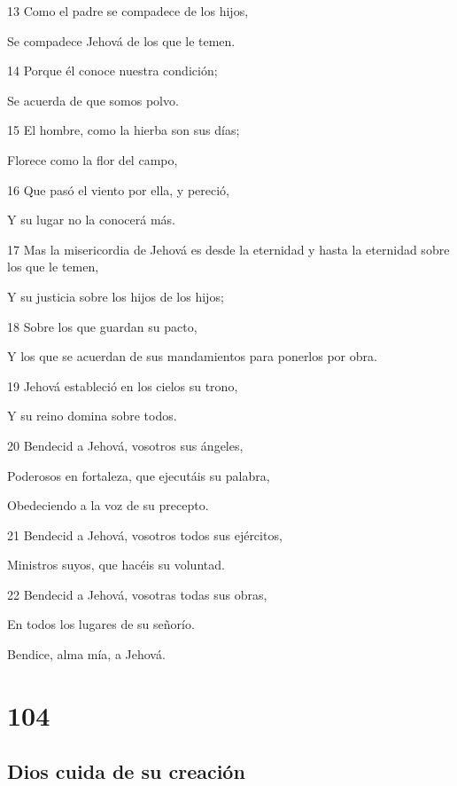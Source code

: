 \par 13 Como el padre se compadece de los hijos,
\par Se compadece Jehová de los que le temen.
\par 14 Porque él conoce nuestra condición;
\par Se acuerda de que somos polvo.
\par 15 El hombre, como la hierba son sus días;
\par Florece como la flor del campo,
\par 16 Que pasó el viento por ella, y pereció,
\par Y su lugar no la conocerá más.
\par 17 Mas la misericordia de Jehová es desde la eternidad y hasta la eternidad sobre los que le temen,
\par Y su justicia sobre los hijos de los hijos;
\par 18 Sobre los que guardan su pacto,
\par Y los que se acuerdan de sus mandamientos para ponerlos por obra.
\par 19 Jehová estableció en los cielos su trono,
\par Y su reino domina sobre todos.
\par 20 Bendecid a Jehová, vosotros sus ángeles,
\par Poderosos en fortaleza, que ejecutáis su palabra,
\par Obedeciendo a la voz de su precepto.
\par 21 Bendecid a Jehová, vosotros todos sus ejércitos,
\par Ministros suyos, que hacéis su voluntad.
\par 22 Bendecid a Jehová, vosotras todas sus obras,
\par En todos los lugares de su señorío.
\par Bendice, alma mía, a Jehová.

\chapter{104}

\section*{Dios cuida de su creación}

